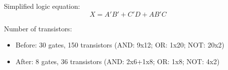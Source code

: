 \documentclass[10pt]{article}
\begin{document}
\begin{enumerate}
  Simplified logic equation:
  \begin{equation*}
    X=A'B'+C'D+AB'C
  \end{equation*}

  Number of transistors:
  \begin{itemize}
    \item Before: 30 gates, 150 transistors (AND: 9x12; OR: 1x20; NOT: 20x2)
    \item After: 8 gates, 36 transistors (AND: 2x6+1x8; OR: 1x8; NOT: 4x2)
  \end{itemize}

\end{enumerate}
\end{document}
